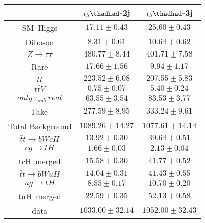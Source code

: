 \centering
\begin{tabular}{ccc}\toprule\toprule
 & $t_{h}\thadhad$-2j                      & $t_{h}\thadhad$-3j \\\midrule
SM~Higgs               &$17.11\pm0.43$               & $25.60\pm0.43$     \\
Diboson                &$8.31\pm0.61$                & $10.64\pm0.62$     \\
$Z\to\tau\tau$         &$480.77\pm8.44$              & $401.71\pm7.58$   \\
Rare                   &$17.66\pm1.56$               & $9.94\pm1.17$     \\
$t\bar{t}$             &$223.52\pm6.08$              & $207.55\pm5.83$    \\
$t\bar{t}V$            &$0.75\pm0.07$                & $5.40\pm0.24$      \\
$only~\tau_{sub}~real$ &$63.55\pm3.54$               & $83.53\pm3.77$     \\
Fake                   &$277.59\pm8.95$              & $333.24\pm9.61$    \\\midrule
Total Background       &$1089.26\pm14.27$            & $1077.61\pm14.14$  \\\midrule\midrule
$\bar{t}t\to bWcH$     &$13.92\pm0.30$               & $39.64\pm0.51$\\
$cg\to tH$             &$1.66\pm0.03$                & $2.13 \pm0.04$\\
tcH~merged             &$15.58\pm0.30$               & $41.77\pm0.52$\\\midrule
$\bar{t}t\to bWuH$     &$14.04\pm0.31$               & $41.43\pm0.55$\\
$ug\to tH$             &$8.55\pm0.17$                & $10.70\pm0.20$\\ 
tuH~merged             &$22.59\pm0.35$               & $52.13\pm0.58$\\   \midrule\midrule
data                   &$1033.00\pm32.14$            & $1052.00\pm32.43$  \\
\bottomrule\bottomrule
\end{tabular}
